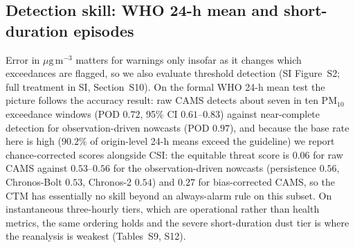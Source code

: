 \documentclass[review,times,authoryear]{elsarticle}
\newcommand*{\ugm}{\ensuremath{\mu\mathrm{g\,m^{-3}}}}
\newcommand*{\pmten}{\ensuremath{\mathrm{PM_{10}}}}
\begin{document}
\subsection{Detection skill: WHO 24-h mean and short-duration episodes}
Error in \ugm{} matters for warnings only insofar as it changes which exceedances are flagged, so we also evaluate threshold detection (SI Figure~S2; full treatment in SI, Section~S10). On the formal WHO 24-h mean test the picture follows the accuracy result: raw CAMS detects about seven in ten \pmten{} exceedance windows (POD $0.72$, 95\% CI $0.61$--$0.83$) against near-complete detection for observation-driven nowcasts (POD $0.97$), and because the base rate here is high ($90.2\%$ of origin-level 24-h means exceed the guideline) we report chance-corrected scores alongside CSI: the equitable threat score is $0.06$ for raw CAMS against $0.53$--$0.56$ for the observation-driven nowcasts (persistence $0.56$, Chronos-Bolt $0.53$, Chronos-2 $0.54$) and $0.27$ for bias-corrected CAMS, so the CTM has essentially no skill beyond an always-alarm rule on this subset. On instantaneous three-hourly tiers, which are operational rather than health metrics, the same ordering holds and the severe short-duration dust tier is where the reanalysis is weakest (Tables~S9, S12).
\end{document}
